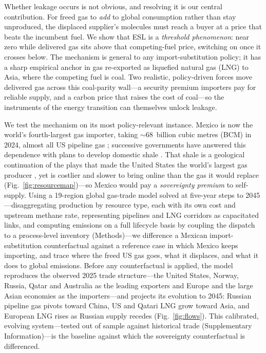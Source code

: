 \documentclass[sn-nature]{sn-jnl}
\theoremstyle{thmstyleone}%
\theoremstyle{thmstyletwo}%
\theoremstyle{thmstylethree}%
\begin{document}
Whether leakage occurs is not obvious, and resolving it is our central
contribution. For freed gas to \emph{add} to global consumption rather than
stay unproduced, the displaced supplier's molecules must reach a buyer at a
price that beats the incumbent fuel. We show that ESL is a \emph{threshold
phenomenon}: near zero while delivered gas sits above that competing-fuel
price, switching on once it crosses below. The mechanism is general to any
import-substitution policy; it has a sharp empirical anchor in gas re-exported
as liquefied natural gas (LNG) to Asia, where the competing fuel is coal. Two
realistic, policy-driven forces move delivered gas across this coal-parity
wall---a security premium importers pay for reliable supply, and a carbon price
that raises the cost of coal---so the instruments of the energy transition can
themselves unlock leakage.

We test the mechanism on its most policy-relevant instance. Mexico is now the
world's fourth-largest gas importer, taking $\sim$68~billion cubic metres (BCM)
in 2024, almost all US pipeline gas \citep{ggr2025, eia_mexico}; successive
governments have answered this dependence with plans to develop domestic shale
\citep{sener, Alpizar2016}. That shale is a geological continuation of the plays
that made the United States the world's largest gas producer \citep{EIA_ARI2013},
yet is costlier and slower to bring online than the gas it would replace
(Fig.~\ref{fig:resourcemap})---so Mexico would pay a \emph{sovereignty premium}
to self-supply. Using a 19-region global gas-trade model solved at five-year
steps to 2045---disaggregating production by resource type, each with its own
cost and upstream methane rate, representing pipelines and LNG corridors as
capacitated links, and computing emissions on a full lifecycle basis by coupling
the dispatch to a process-level inventory (Methods)---we difference a Mexican
import-substitution counterfactual against a reference case in which Mexico keeps
importing, and trace where the freed US gas goes, what it displaces, and what it
does to global emissions. Before any counterfactual is applied, the model
reproduces the observed 2025 trade structure---the United States, Norway,
Russia, Qatar and Australia as the leading exporters and Europe and the large
Asian economies as the importers---and projects its evolution to 2045: Russian
pipeline gas pivots toward China, US and Qatari LNG grow toward Asia, and
European LNG rises as Russian supply recedes (Fig.~\ref{fig:flows}). This
calibrated, evolving system---tested out of sample against historical trade
(Supplementary Information)---is the baseline against which the sovereignty
counterfactual is differenced.
\end{document}
